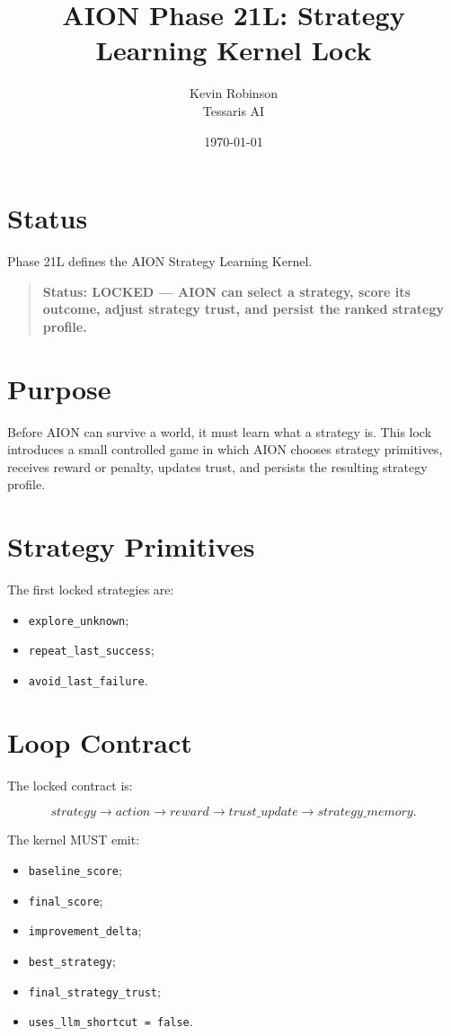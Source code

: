\documentclass[11pt,a4paper]{article}
\title{\textbf{AION Phase 21L: Strategy Learning Kernel Lock}}
\author{Kevin Robinson\\Tessaris AI}
\date{\today}
\begin{document}
\maketitle

\section{Status}

Phase 21L defines the AION Strategy Learning Kernel.

\begin{quote}
\textbf{Status: LOCKED --- AION can select a strategy, score its outcome, adjust strategy trust, and persist the ranked strategy profile.}
\end{quote}

\section{Purpose}

Before AION can survive a world, it must learn what a strategy is. This lock introduces a small controlled game in which AION chooses strategy primitives, receives reward or penalty, updates trust, and persists the resulting strategy profile.

\section{Strategy Primitives}

The first locked strategies are:

\begin{itemize}
  \item \texttt{explore\_unknown};
  \item \texttt{repeat\_last\_success};
  \item \texttt{avoid\_last\_failure}.
\end{itemize}

\section{Loop Contract}

The locked contract is:

\[
strategy \rightarrow action \rightarrow reward \rightarrow trust\_update \rightarrow strategy\_memory.
\]

The kernel MUST emit:

\begin{itemize}
  \item \texttt{baseline\_score};
  \item \texttt{final\_score};
  \item \texttt{improvement\_delta};
  \item \texttt{best\_strategy};
  \item \texttt{final\_strategy\_trust};
  \item \texttt{uses\_llm\_shortcut = false}.
\end{itemize}
\end{document}
